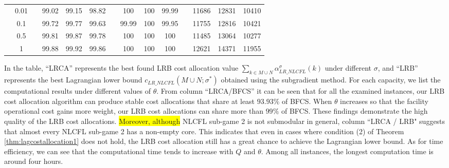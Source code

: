 \documentclass[ijoc,nonblindrev]{informs3} %
\begin{document}
\begin{table}[H]
\begin{tabular}[!h]{c c c c c c c c c c c c c c}
&0.01  &  &99.02	&99.15	&98.82	&	&100	&100	&99.99	&	&11686	&12831	&10410\\

&0.1  &  &99.72	&99.77	&99.63	&	&99.99	&100	&99.95	&	&11755	&12816	&10421\\

&0.5  &  &99.81	&99.87	&99.78	&	&100	&100	&100	&	&11485	&13064	&10277\\

&1  &  &99.88	&99.92	&99.86	&	&100	&100	&100	&	&12621	&14371	&11955\\
\hline
\end{tabular}
\vspace{-3mm}
\end{table}



In the table, ``LRCA'' represents the best found LRB cost allocation value $\sum_{k \in M \cup N}\alpha_{LR\_NLCFL}^{\sigma}(k)$ under different $\sigma$, and ``LRB'' represents the best Lagrangian lower bound $c_{LR\_NLCFL}(M \cup N; \sigma^*)$ obtained using the subgradient method. For each capacity, we list the computational results under different values of $\theta$.
From column ``LRCA/BFCS'' it can be seen that for all the examined instances, our LRB cost allocation algorithm can produce stable cost allocations that share at least $93.93\%$ of BFCS. When  $\theta$ increases so that the facility operational cost gains more weight, our LRB cost allocations can share more than $99\%$ of BFCS. 
These findings demonstrate the high quality of the LRB cost allocations. 
\colorbox{yellow}{Moreover, although} NLCFL sub-game 2 is not submodular in general, column ``LRCA / LRB" suggests that almost every NLCFL sub-game 2 has a non-empty core.
This indicates that even in cases where condition (2) of Theorem \ref{thm:lagcostallocation1} does not hold, the LRB cost allocation still has a great chance to achieve the Lagrangian lower bound.
As for time efficiency, we can see that the computational time tends to increase with $Q$ and $\theta$. Among all instances, the longest computation time is around four hours.
\end{document}

